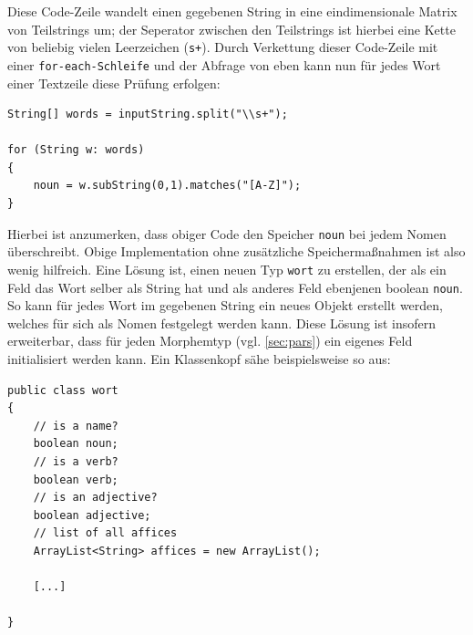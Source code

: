\documentclass[12pt,twoside]{article}
\theoremstyle{plain}
\theoremstyle{definition}
\theoremstyle{remark}
\begin{document}
Diese Code-Zeile wandelt einen gegebenen String in eine eindimensionale Matrix von Teilstrings um; der Seperator zwischen den Teilstrings ist hierbei eine Kette von beliebig vielen Leerzeichen (\texttt{s+}).
Durch Verkettung dieser Code-Zeile mit einer \texttt{for-each-Schleife} und der Abfrage von eben kann nun für jedes Wort einer Textzeile diese Prüfung erfolgen:
\begin{lstlisting}
String[] words = inputString.split("\\s+");

for (String w: words)
{
	noun = w.subString(0,1).matches("[A-Z]");
}
\end{lstlisting}
Hierbei ist anzumerken, dass obiger Code den Speicher \texttt{noun} bei jedem Nomen überschreibt.
Obige Implementation ohne zusätzliche Speichermaßnahmen ist also wenig hilfreich.
Eine Lösung ist, einen neuen Typ \texttt{wort} zu erstellen, der als ein Feld das Wort selber als String hat und als anderes Feld ebenjenen boolean \texttt{noun}.
So kann für jedes Wort im gegebenen String ein neues Objekt erstellt werden, welches für sich als Nomen festgelegt werden kann.
Diese Lösung ist insofern erweiterbar, dass für jeden Morphemtyp (vgl. \ref{sec:pars}) ein eigenes Feld initialisiert werden kann.
Ein Klassenkopf sähe beispielsweise so aus:
\begin{lstlisting}[caption=Beispielhafter Klassenkopf für den Typ 'wort']
public class wort
{
	// is a name?
	boolean noun;
	// is a verb?
	boolean verb;
	// is an adjective?
	boolean adjective;
	// list of all affices
	ArrayList<String> affices = new ArrayList();
	
	[...]

}
\end{lstlisting}
\end{document}
